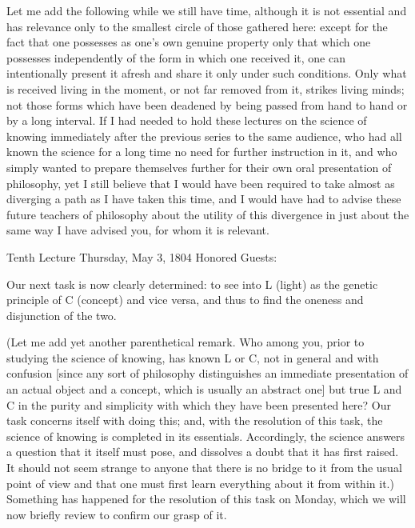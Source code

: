 Let me add the following while we still have time,
although it is not essential and has relevance
only to the smallest circle of those gathered here:
except for the fact that one possesses
as one’s own genuine property only that which one possesses
independently of the form in which one received it,
one can intentionally present it afresh
and share it only under such conditions.
Only what is received living in the moment,
or not far removed from it, strikes living minds;
not those forms which have been deadened by
being passed from hand to hand or by a long interval.
If I had needed to hold these lectures
on the science of knowing immediately
after the previous series to the same audience,
who had all known the science for a long time
no need for further instruction in it,
and who simply wanted to prepare themselves
further for their own oral presentation of philosophy,
yet I still believe that I would have been required to
take almost as diverging a path as I have taken this time,
and I would have had to advise these future
teachers of philosophy about the utility of this divergence
in just about the same way I have advised you,
for whom it is relevant.

Tenth Lecture
Thursday, May 3, 1804
Honored Guests:

Our next task is now clearly determined:
to see into L (light)
as the genetic principle of C (concept)
and vice versa, and thus to find
the oneness and disjunction of the two.

(Let me add yet another parenthetical remark.
Who among you, prior to studying the science of knowing,
has known L or C, not in general and with confusion
[since any sort of philosophy
distinguishes an immediate presentation
of an actual object and a concept,
which is usually an abstract one]
but true L and C in the purity and simplicity
with which they have been presented here?
Our task concerns itself with doing this;
and, with the resolution of this task,
the science of knowing is completed
in its essentials.
Accordingly, the science answers
a question that it itself must pose,
and dissolves a doubt that it has first raised.
It should not seem strange to anyone that
there is no bridge to it from the usual point of view
and that one must first learn everything
about it from within it.)
Something has happened for the resolution
of this task on Monday,
which we will now briefly review
to confirm our grasp of it.

